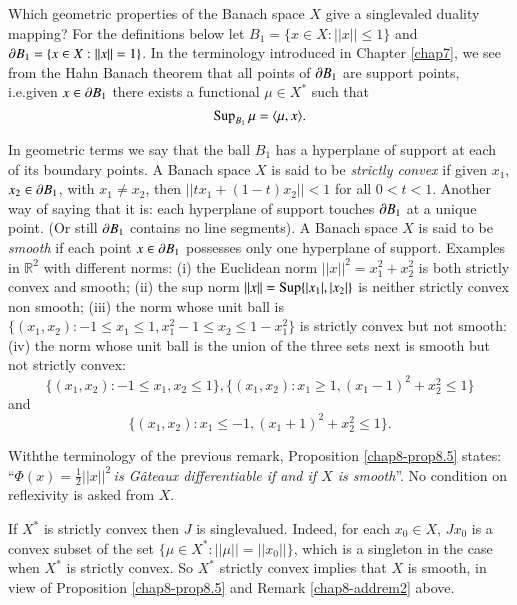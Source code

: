 \setcounter{remark}{0}
\begin{remark}\label{chap8-addrem1}
Which geometric properties of the Banach space $X$ give a singlevaled
duality mapping? For the definitions below let $B_{1}=\{x\in
X:||x||\leq 1\}$ and $\partial B_{1}=\{x\in X:||x||=1\}$. In the terminology
introduced in Chapter \ref{chap7}, we see from the Hahn Banach theorem
that all points of $\partial B_{1}$ are support points, i.e.\@ given $x\in
\partial B_{1}$ there exists a functional $\mu\in X^{*}$ such that
$$
\operatorname{Sup}_{B_{1}}\mu=\langle \mu,x\rangle.
$$

In geometric terms we say that the ball $B_{1}$ has a hyperplane of
support at each of its boundary points. A Banach space $X$ is said to
be {\em strictly convex} if given $x_{1}$, $x_{2}\in \partial B_{1}$, with
$x_{1}\neq x_{2}$, then $||tx_{1}+(1-t)x_{2}||<1$ for all
$0<t<1$. Another way of saying that it is: each hyperplane of support
touches $\partial B_{1}$ at a unique point. (Or still $\partial B_{1}$ contains no
line segments). A Banach space $X$ is said to be {\em smooth} if each
point $x\in \partial B_{1}$ possesses only one hyperplane of
support. Examples in $\mathbb{R}^{2}$ with different norms: (i) the
Euclidean norm $||x||^{2}=x^{2}_{1}+x^{2}_{2}$ is both strictly convex
and smooth; (ii) the sup norm $||x||=\operatorname{Sup}\{|x_{1}|,|x_{2}|\}$ is
neither strictly convex non smooth; (iii) the norm whose unit ball is
$\{(x_{1},x_{2}):-1\leq x_{1}\leq 1,x^{2}_{1}-1\leq x_{2}\leq
1-x^{2}_{1}\}$ is strictly convex but not smooth: (iv) the norm whose
unit ball is the union of the three sets next is smooth but not
strictly convex:
$$
\{(x_{1},x_{2}):-1\leq x_{1},x_{2}\leq 1\},\{(x_{1},x_{2}):x_{1}\geq
1,(x_{1}-1)^{2}+x^{2}_{2}\leq 1\}
$$
and
$$
\{(x_{1},x_{2}):x_{1}\leq -1,(x_{1}+1)^{2}+x^{2}_{2}\leq 1\}.
$$
\end{remark}

\begin{remark}\label{chap8-addrem2}
With\pageoriginale the terminology of the previous remark, Proposition
\ref{chap8-prop8.5} states: ``$\Phi(x)=\frac{1}{2}||x||^{2}$\,{\em is
  G\^ateaux differentiable if and if $X$ is smooth}''. No condition on
reflexivity is asked from $X$.
\end{remark}

\begin{remark}\label{chap8-addrem3}
If $X^{*}$ is strictly convex then $J$ is singlevalued. Indeed, for
each $x_{0}\in X$, $Jx_{0}$ is a convex subset of the set $\{\mu\in
X^{*}:||\mu||=||x_{0}||\}$, which is a singleton in the case when
$X^{*}$ is strictly convex. So $X^{*}$ strictly convex implies that
$X$ is smooth, in view of Proposition \ref{chap8-prop8.5} and Remark
\ref{chap8-addrem2} above.
\end{remark}


